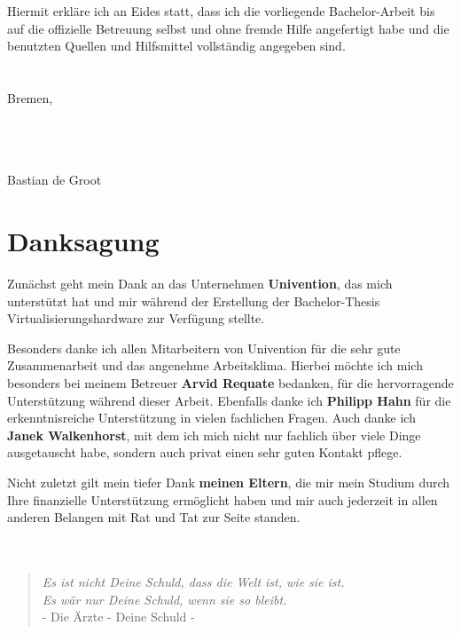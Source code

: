 \documentclass[parskip*,DIV12,BCOR10mm,headsepline,a4paper,12pt]{scrreprt}
\begin{document}
Hiermit erkläre ich an Eides statt, dass ich die vorliegende Bachelor-Arbeit bis auf die offizielle Betreuung selbst und ohne fremde Hilfe angefertigt habe und die benutzten Quellen und Hilfsmittel vollständig angegeben sind.
\\\\\\
Bremen, \date{\today}
\\\\\\
Bastian de Groot
\newpage
\chapter*{Danksagung}
Zunächst geht mein Dank an das Unternehmen \textbf{Univention}, das mich unterstützt hat und mir während der Erstellung der Bachelor-Thesis Virtualisierungshardware zur Verfügung stellte.

Besonders danke ich allen Mitarbeitern von Univention für die sehr gute Zusammenarbeit und das angenehme Arbeitsklima. Hierbei möchte ich mich besonders bei meinem Betreuer \textbf{Arvid Requate} bedanken, für die hervorragende Unterstützung während dieser Arbeit. Ebenfalls danke ich \textbf{Philipp Hahn} für die erkenntnisreiche Unterstützung in vielen fachlichen Fragen. Auch danke ich \textbf{Janek Walkenhorst}, mit dem ich mich nicht nur fachlich über viele Dinge ausgetauscht habe, sondern auch privat einen sehr guten Kontakt pflege.

Nicht zuletzt gilt mein tiefer Dank \textbf{meinen Eltern}, die mir mein Studium durch Ihre finanzielle Unterstützung ermöglicht haben und mir auch jederzeit in allen anderen Belangen mit Rat und Tat zur Seite standen.
\\\\\\
\begin{quote}\centering
\textit{Es ist nicht Deine Schuld, dass die Welt ist, wie sie ist.\\
Es wär nur Deine Schuld, wenn sie so bleibt.}\\
\fontsize{9pt}{10pt}\selectfont - Die Ärzte - Deine Schuld -
\end{quote}

\newpage
\tableofcontents






\appendix

\newpage





\listoffigures
\lstlistoflistings
\end{document}
